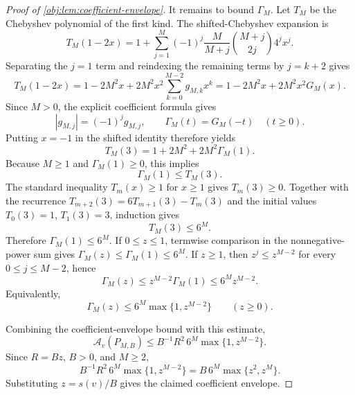 \begin{proof}[Proof of \cref{obj:lem:coefficient-envelope}]
It remains to bound \(\Gamma_M\). Let \(T_M\) be the Chebyshev polynomial of the first kind. The shifted-Chebyshev expansion is
\[
T_M(1-2x)
=1+\sum_{j=1}^{M}(-1)^j\frac{M}{M+j}{M+j\choose 2j}4^j x^j.
\]
Separating the \(j=1\) term and reindexing the remaining terms by \(j=k+2\) gives
\[
T_M(1-2x)
=1-2M^2x+2M^2x^2\sum_{k=0}^{M-2}g_{M,k}x^k
=1-2M^2x+2M^2x^2G_M(x).
\]
Since \(M>0\), the explicit coefficient formula gives
\[
|g_{M,j}|=(-1)^jg_{M,j},
\qquad
\Gamma_M(t)=G_M(-t)\quad(t\ge0).
\]
Putting \(x=-1\) in the shifted identity therefore yields
\[
T_M(3)=1+2M^2+2M^2\Gamma_M(1).
\]
Because \(M\ge1\) and \(\Gamma_M(1)\ge0\), this implies
\[
\Gamma_M(1)\le T_M(3).
\]
The standard inequality \(T_m(x)\ge1\) for \(x\ge1\) gives \(T_m(3)\ge0\). Together with the recurrence \(T_{m+2}(3)=6T_{m+1}(3)-T_m(3)\) and the initial values \(T_0(3)=1\), \(T_1(3)=3\), induction gives
\[
T_M(3)\le6^M.
\]
Therefore \(\Gamma_M(1)\le6^M\). If \(0\le z\le1\), termwise comparison in the nonnegative-power sum gives \(\Gamma_M(z)\le\Gamma_M(1)\le6^M\). If \(z\ge1\), then \(z^j\le z^{M-2}\) for every \(0\le j\le M-2\), hence
\[
\Gamma_M(z)\le z^{M-2}\Gamma_M(1)\le6^Mz^{M-2}.
\]
Equivalently,
\[
\Gamma_M(z)\le6^M\max\{1,z^{M-2}\}\qquad(z\ge0). %
\]

Combining the coefficient-envelope bound with this estimate,
\[
\mathcal A_v(P_{M,B})
\le
B^{-1}R^2\,6^M\max\{1,z^{M-2}\}.
\]
Since \(R=Bz\), \(B>0\), and \(M\ge2\),
\[
B^{-1}R^2\,6^M\max\{1,z^{M-2}\}
=
B\,6^M\max\{z^2,z^M\}.
\]
Substituting \(z=s(v)/B\) gives the claimed coefficient envelope. %
\end{proof}
